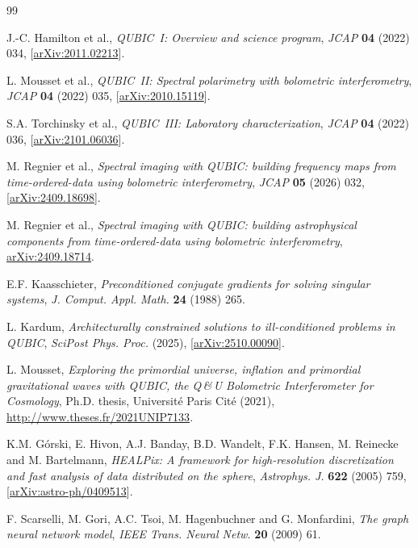 \documentclass[a4paper,11pt]{article}
\begin{document}
\begin{thebibliography}{99}

J.-C. Hamilton et al.,
\emph{QUBIC~I: Overview and science program},
\emph{JCAP} {\bf 04} (2022) 034,
[\href{https://arxiv.org/abs/2011.02213}{arXiv:2011.02213}].

L. Mousset et al.,
\emph{QUBIC~II: Spectral polarimetry with bolometric interferometry},
\emph{JCAP} {\bf 04} (2022) 035,
[\href{https://arxiv.org/abs/2010.15119}{arXiv:2010.15119}].

S.A. Torchinsky et al.,
\emph{QUBIC~III: Laboratory characterization},
\emph{JCAP} {\bf 04} (2022) 036,
[\href{https://arxiv.org/abs/2101.06036}{arXiv:2101.06036}].

M. Regnier et al.,
\emph{Spectral imaging with QUBIC: building frequency maps from
time-ordered-data using bolometric interferometry},
\emph{JCAP} {\bf 05} (2026) 032,
[\href{https://arxiv.org/abs/2409.18698}{arXiv:2409.18698}].

M. Regnier et al.,
\emph{Spectral imaging with QUBIC: building astrophysical components from
time-ordered-data using bolometric interferometry},
\href{https://arxiv.org/abs/2409.18714}{arXiv:2409.18714}.

E.F. Kaasschieter,
\emph{Preconditioned conjugate gradients for solving singular systems},
\emph{J. Comput. Appl. Math.} {\bf 24} (1988) 265.

L. Kardum,
\emph{Architecturally constrained solutions to ill-conditioned problems
in QUBIC},
\emph{SciPost Phys. Proc.} (2025),
[\href{https://arxiv.org/abs/2510.00090}{arXiv:2510.00090}].

L. Mousset,
\emph{Exploring the primordial universe, inflation and primordial
gravitational waves with QUBIC, the Q\,\&\,U Bolometric Interferometer
for Cosmology},
Ph.D. thesis, Universit\'{e} Paris Cit\'{e} (2021),
\url{http://www.theses.fr/2021UNIP7133}.

K.M. G\'{o}rski, E. Hivon, A.J. Banday, B.D. Wandelt, F.K. Hansen, M. Reinecke and M. Bartelmann,
\emph{HEALPix: A framework for high-resolution discretization and fast analysis of data distributed on the sphere},
\emph{Astrophys. J.} {\bf 622} (2005) 759,
[\href{https://arxiv.org/abs/astro-ph/0409513}{arXiv:astro-ph/0409513}].

F. Scarselli, M. Gori, A.C. Tsoi, M. Hagenbuchner and G. Monfardini,
\emph{The graph neural network model},
\emph{IEEE Trans. Neural Netw.} {\bf 20} (2009) 61.


\end{thebibliography}
\end{document}
